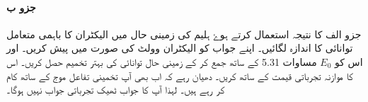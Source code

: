\paragraph*{جزو ب}
جزو الف کا نتیجہ استعمال کرتے ہوۓ ہلیم کی زمینی حال میں الیکٹران کا باہمی متعامل توانائی کا اندازہ لگائیں۔ اپنے جواب کو الیکٹران وولٹ کی صورت میں پیش کریں۔ اور اس کو $ E_{0} $ مساوات 5.31 کے ساتھ جمع کر کے زمینی حال توانائی کی بہتر تخمیم حصل کریں۔ اس کا موازنہ تجرباتی قیمت کے ساتھ کریں۔ دھیان رہے کہ اب بھی آپ تخمینی تفاعل موج کے ساتھ کام کر رہے ہیں۔ لہذا آپ کا جواب ٹھیک تجرباتی جواب نہیں ہوگا۔  
 
 
